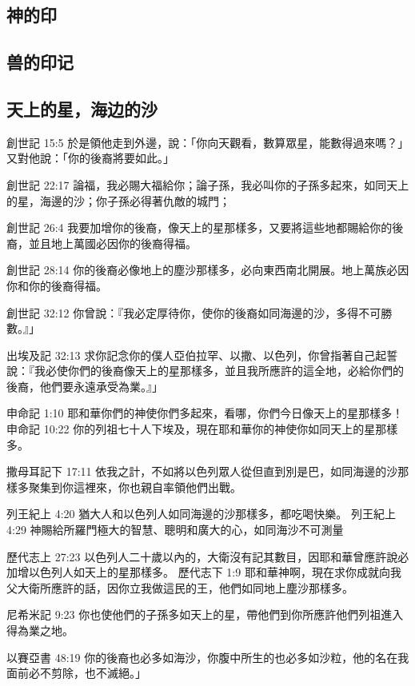 \subsection{神的印}


\subsection{兽的印记}


\subsection{天上的星，海边的沙}

創世記 15:5
於是領他走到外邊，說：「你向天觀看，數算眾星，能數得過來嗎？」又對他說：「你的後裔將要如此。」

創世記 22:17 論福，我必賜大福給你；論子孫，我必叫你的子孫多起來，如同天上的星，海邊的沙；你子孫必得著仇敵的城門；

創世記 26:4
我要加增你的後裔，像天上的星那樣多，又要將這些地都賜給你的後裔，並且地上萬國必因你的後裔得福。

創世記 28:14
你的後裔必像地上的塵沙那樣多，必向東西南北開展。地上萬族必因你和你的後裔得福。

創世記 32:12
你曾說：『我必定厚待你，使你的後裔如同海邊的沙，多得不可勝數。』」

出埃及記 32:13
求你記念你的僕人亞伯拉罕、以撒、以色列，你曾指著自己起誓說：『我必使你們的後裔像天上的星那樣多，並且我所應許的這全地，必給你們的後裔，他們要永遠承受為業。』」

申命記 1:10
耶和華你們的神使你們多起來，看哪，你們今日像天上的星那樣多！
申命記 10:22
你的列祖七十人下埃及，現在耶和華你的神使你如同天上的星那樣多。

撒母耳記下 17:11 依我之計，不如將以色列眾人從但直到別是巴，如同海邊的沙那樣多聚集到你這裡來，你也親自率領他們出戰。

列王紀上 4:20
猶大人和以色列人如同海邊的沙那樣多，都吃喝快樂。
列王紀上 4:29
神賜給所羅門極大的智慧、聰明和廣大的心，如同海沙不可測量

歷代志上 27:23
以色列人二十歲以內的，大衛沒有記其數目，因耶和華曾應許說必加增以色列人如天上的星那樣多。
歷代志下 1:9
耶和華神啊，現在求你成就向我父大衛所應許的話，因你立我做這民的王，他們如同地上塵沙那樣多。

尼希米記 9:23 你也使他們的子孫多如天上的星，帶他們到你所應許他們列祖進入得為業之地。

以賽亞書 48:19 你的後裔也必多如海沙，你腹中所生的也必多如沙粒，他的名在我面前必不剪除，也不滅絕。」

